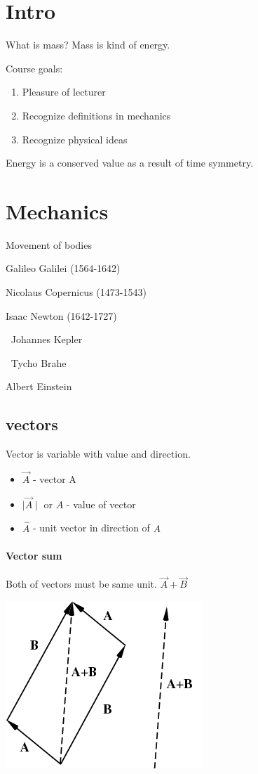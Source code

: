 \section{Intro}

What is mass? Mass is kind of energy.


Course goals:
\begin{enumerate}
	\item Pleasure of lecturer 
	\item Recognize definitions in mechanics
	\item Recognize physical ideas
\end{enumerate}
 Energy is a conserved value as a result of time symmetry.
 
 
 \section{Mechanics}
 
 Movement of bodies
 
Galileo Galilei (1564-1642)

Nicolaus Copernicus (1473-1543)

Isaac Newton (1642-1727)

$\:$ Johannes Kepler

$\:$ Tycho Brahe

Albert Einstein
\subsection{vectors}
Vector is variable with value and direction.
\begin{itemize}
	\item  $\vec{A}$ - vector A
	\item  $\mid \vec{A} \mid$ or $A$ -  value of vector
	\item  $\hat{A}$  - unit vector in direction of $A$
\end{itemize}
\paragraph{Vector sum}
Both of vectors must be same unit.
$\vec{A}+\vec{B}$

\begin{center}
	\includegraphics[width=0.3\linewidth]{./lect1/pic1.png}
\end{center}

